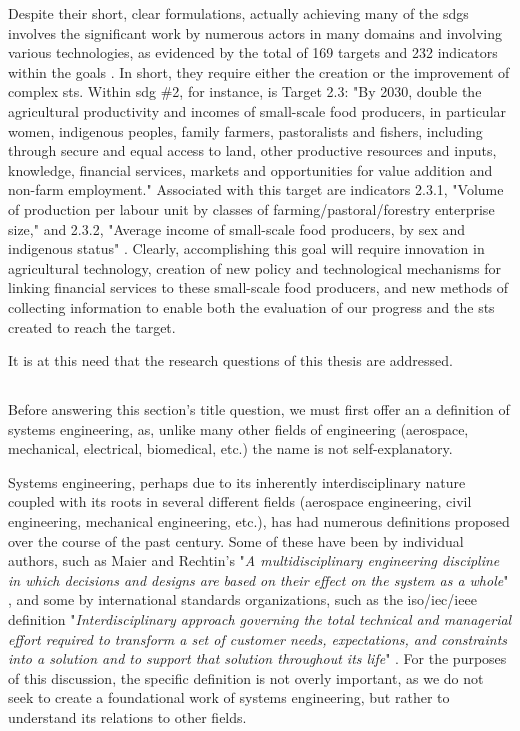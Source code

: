 Despite their short, clear formulations, actually achieving many of the \acp{sdg} involves the significant work by numerous actors in many domains and involving various technologies, as evidenced by the total of 169 targets and  232 indicators within the goals \cite{unitednationsgeneralassemblyGlobalIndicatorFramework2017}. In short, they require either the creation or the improvement of complex \ac{sts}. Within \ac{sdg} \#2, for instance, is Target 2.3: "By 2030, double the agricultural productivity and incomes of small-scale food producers, in particular women, indigenous peoples, family farmers, pastoralists and fishers, including through secure and equal access to land, other productive resources and inputs, knowledge, financial services, markets and opportunities for value addition and non-farm employment." Associated with this target are indicators 2.3.1, "Volume of production per labour unit by classes of farming/pastoral/forestry enterprise size," and 2.3.2, "Average income of small-scale food producers, by sex and indigenous status" \cite{unitednationsgeneralassemblyGlobalIndicatorFramework2017}. Clearly, accomplishing this goal will require innovation in agricultural technology, creation of new policy and technological mechanisms for linking financial services to these small-scale food producers, and new methods of collecting information to enable both the evaluation of our progress and the \ac{sts} created to reach the target. 

It is at this need that the research questions of this thesis are addressed.

\subsection{} \label{sec:se}

Before answering this section's title question, we must first offer an a definition of systems engineering, as, unlike many other fields of engineering (aerospace, mechanical, electrical, biomedical, etc.) the name is not self-explanatory. 

Systems engineering, perhaps due to its inherently interdisciplinary nature coupled with its roots in several different fields (aerospace engineering, civil engineering, mechanical engineering, etc.), has had numerous definitions proposed over the course of the past century. Some of these have been by individual authors, such as Maier and Rechtin's "\textit{A multidisciplinary engineering discipline in which decisions and designs are based on their effect on the system as a whole}" \cite{maierArtSystemsArchitecting2009}, and some by international standards organizations, such as the \ac{iso}/\ac{iec}/\ac{ieee} definition "\textit{Interdisciplinary approach governing the total technical and managerial effort required to transform a set of customer needs, expectations, and constraints into a solution and to support that solution throughout its life}" \cite{internationalorganizationforstandardizationSystemsSoftwareEngineering2010} . For the purposes of this discussion, the specific definition is not overly important, as we do not seek to create a foundational work of systems engineering, but rather to understand its relations to other fields.

